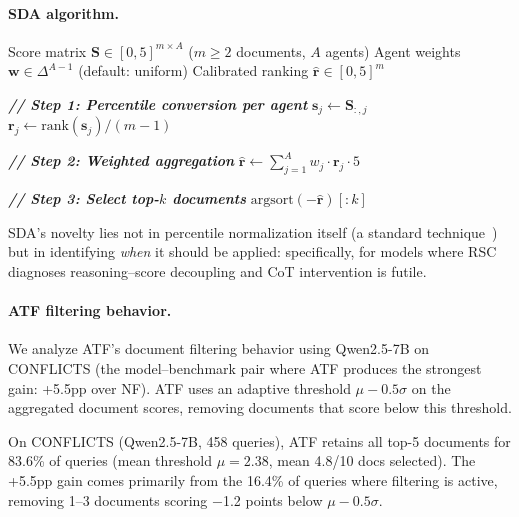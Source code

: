 \documentclass[11pt]{article}
\theoremstyle{definition}
\begin{document}
\paragraph{SDA algorithm.}

\begin{algorithm}[htb]
\footnotesize
\caption{Score Distribution Alignment (SDA)}
\label{alg:sda}
\begin{algorithmic}[1]
\Require Score matrix \(\mathbf{S} \in [0,5]^{m \times A}\) (\(m \geq 2\) documents, \(A\) agents)
\Require Agent weights \(\mathbf{w} \in \Delta^{A-1}\) (default: uniform)
\Ensure Calibrated ranking \(\hat{\mathbf{r}} \in [0, 5]^m\)

\Statex
\Statex \textbf{\textit{// Step 1: Percentile conversion per agent}}
  \State \(\mathbf{s}_j \leftarrow \mathbf{S}_{:,j}\) 
  \State \(\mathbf{r}_j \leftarrow \text{rank}(\mathbf{s}_j) / (m - 1)\) 
\EndFor

\Statex
\Statex \textbf{\textit{// Step 2: Weighted aggregation}}
\State \(\hat{\mathbf{r}} \leftarrow \sum_{j=1}^{A} w_j \cdot \mathbf{r}_j \cdot 5\) 

\Statex
\Statex \textbf{\textit{// Step 3: Select top-\(k\) documents}}
\State \Return \(\text{argsort}(-\hat{\mathbf{r}})[:k]\)
\end{algorithmic}
\end{algorithm}

\noindent SDA's novelty lies not in percentile normalization itself
(a standard technique~\citep{cormack2009reciprocal}) but in identifying
\emph{when} it should be applied: specifically, for models where RSC
diagnoses reasoning--score decoupling and CoT intervention is futile.

\paragraph{ATF filtering behavior.}
\label{sec:appendix-atf-analysis}
We analyze ATF's document filtering behavior using Qwen2.5-7B on
CONFLICTS (the model--benchmark pair where ATF produces the strongest
gain: +5.5pp over NF).
ATF uses an adaptive threshold \(\mu - 0.5\sigma\) on the aggregated
document scores, removing documents that score below this threshold.

\noindent On CONFLICTS (Qwen2.5-7B, 458 queries), ATF retains all top-5 documents for 83.6\% of queries (mean threshold \(\mu{=}2.38\), mean 4.8/10 docs selected).
The +5.5pp gain comes primarily from the 16.4\% of queries where filtering is active, removing 1--3 documents scoring \(-\)1.2 points below \(\mu - 0.5\sigma\).
\end{document}
